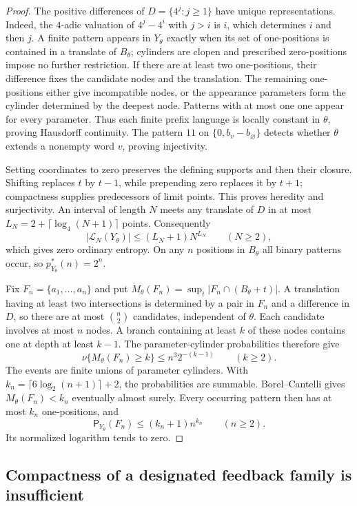 \documentclass[11pt,reqno]{amsart}
\numberwithin{equation}{section}
\theoremstyle{definition}
\newcommand{\Patt}{\mathsf P}
\begin{document}
\begin{proof}
The positive differences of $D=\{4^j:j\ge1\}$ have unique
representations. Indeed, the $4$-adic valuation of
$4^j-4^i$ with $j>i$ is $i$, which determines $i$ and then $j$.
A finite pattern appears in $Y_\theta$ exactly when its set of
one-positions is contained in a translate of $B_\theta$;
cylinders are clopen and prescribed zero-positions impose no
further restriction. If there are at least two one-positions,
their difference fixes the candidate nodes and the translation.
The remaining one-positions either give incompatible nodes, or
the appearance parameters form the cylinder determined by the
deepest node. Patterns with at most one one appear for every
parameter. Thus each finite prefix language is locally constant
in $\theta$, proving Hausdorff continuity. The pattern $11$ on
$\{0,b_v-b_\varnothing\}$ detects whether $\theta$ extends a
nonempty word $v$, proving injectivity.

Setting coordinates to zero preserves the defining supports and
then their closure. Shifting replaces $t$ by $t-1$, while
prepending zero replaces it by $t+1$; compactness supplies
predecessors of limit points. This proves heredity and surjectivity.
An interval of length $N$ meets any translate of $D$ in at most
$L_N=2+\lceil\log_4(N+1)\rceil$ points. Consequently
\[
 |\mathcal L_N(Y_\theta)|
 \le (L_N+1)N^{L_N}\qquad(N\ge2),
\]
which gives zero ordinary entropy. On any $n$ positions in
$B_\theta$ all binary patterns occur, so $p_{Y_\theta}^*(n)=2^n$.

Fix $F_n=\{a_1,\ldots,a_n\}$ and put
$M_\theta(F_n)=\sup_t|F_n\cap(B_\theta+t)|$.
A translation having at least two intersections is determined
by a pair in $F_n$ and a difference in $D$, so there are at most
$\binom n2$ candidates, independent of $\theta$. Each candidate
involves at most $n$ nodes. A branch containing at least $k$
of these nodes contains one at depth at least $k-1$. The
parameter-cylinder probabilities therefore give
\[
 \nu\{M_\theta(F_n)\ge k\}\le n^3 2^{-(k-1)}
 \qquad(k\ge2).
\]
The events are finite unions of parameter cylinders. With
$k_n=\lceil6\log_2(n+1)\rceil+2$, the probabilities are summable.
Borel--Cantelli gives $M_\theta(F_n)<k_n$ eventually almost surely.
Every occurring pattern then has at most $k_n$ one-positions, and
\[
 \Patt_{Y_\theta}(F_n)\le(k_n+1)n^{k_n}\qquad(n\ge2).
\]
Its normalized logarithm tends to zero.
\end{proof}

\subsection{Compactness of a designated feedback family is insufficient}
\end{document}
